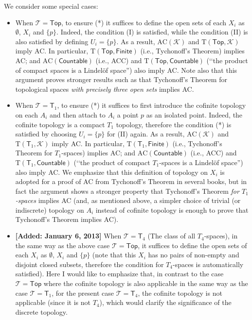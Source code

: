 \documentclass{article}
\begin{document}
We consider some special cases:
\begin{itemize}
\item When $\mathcal{T} = \mathsf{Top}$, to ensure (*) it suffices to define the open sets of each $X_i$ as $\emptyset$, $X_i$ and $\{p\}$.
Indeed, the condition (I) is satisfied, while the condition (II) is also satisfied by defining $U_i = \{p\}$.
As a result, $\mathrm{AC}(\mathcal{K})$ and $\mathrm{T}(\mathsf{Top},\mathcal{K})$ imply AC.
In particular, $\mathrm{T}(\mathsf{Top},\mathsf{Finite})$ (i.e., Tychonoff's Theorem) implies AC; and $\mathrm{AC}(\mathsf{Countable})$ (i.e., ACC) and $\mathrm{T}(\mathsf{Top},\mathsf{Countable})$ (\lq\lq the product of compact spaces is a Lindel\"{o}f space'') also imply AC.
Note also that this argument proves stronger results such as that Tychonoff's Theorem for topological spaces \emph{with precisely three open sets} implies AC.
\item When $\mathcal{T} = \mathsf{T}_1$, to ensure (*) it suffices to first introduce the cofinite topology on each $A_i$ and then attach to $A_i$ a point $p$ as an isolated point.
Indeed, the cofinite topology is a compact $T_1$ topology, therefore the condition (*) is satisfied by choosing $U_i = \{p\}$ for (II) again.
As a result, $\mathrm{AC}(\mathcal{K})$ and $\mathrm{T}(\mathsf{T}_1,\mathcal{K})$ imply AC.
In particular, $\mathrm{T}(\mathsf{T}_1,\mathsf{Finite})$ (i.e., Tychonoff's Theorem for $T_1$-spaces) implies AC; and $\mathrm{AC}(\mathsf{Countable})$ (i.e., ACC) and $\mathrm{T}(\mathsf{T}_1,\mathsf{Countable})$ (\lq\lq the product of compact $T_1$-spaces is a Lindel\"{o}f space'') also imply AC.
We emphasize that this definition of topology on $X_i$ is adopted for a proof of AC from Tychonoff's Theorem in several books, but in fact the argument shows a stronger property that Tychonoff's Theorem \emph{for $T_1$-spaces} implies AC (and, as mentioned above, a simpler choice of trivial (or indiscrete) topology on $A_i$ instead of cofinite topology is enough to prove that Tychonoff's Theorem implies AC).
\item \textbf{[Added: January 6, 2013]}
When $\mathcal{T} = \mathsf{T}_4$ (The class of all $T_4$-spaces), in the same way as the above case $\mathcal{T} = \mathsf{Top}$, it suffices to define the open sets of each $X_i$ as $\emptyset$, $X_i$ and $\{p\}$ (note that this $X_i$ has no pairs of non-empty and disjoint closed subsets, therefore the condition for $T_4$-spaces is automatically satisfied).
Here I would like to emphasize that, in contrast to the case $\mathcal{T} = \mathsf{Top}$ where the cofinite topology is also applicable in the same way as the case $\mathcal{T} = \mathsf{T}_1$, for the present case $\mathcal{T} = \mathsf{T}_4$, the cofinite topology is not applicable (since it is not $T_4$), which would clarify the significance of the discrete topology.

\end{itemize}
\end{document}

